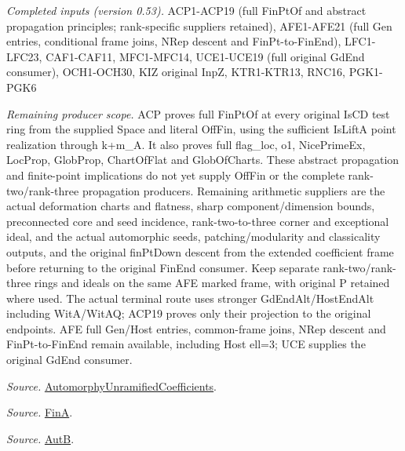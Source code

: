 \emph{Completed inputs (version 0.53).} ACP1-ACP19 (full FinPtOf and abstract propagation principles; rank-specific suppliers retained), AFE1-AFE21 (full Gen entries, conditional frame joins, NRep descent and FinPt-to-FinEnd), LFC1-LFC23, CAF1-CAF11, MFC1-MFC14, UCE1-UCE19 (full original GdEnd consumer), OCH1-OCH30, KIZ original InpZ, KTR1-KTR13, RNC16, PGK1-PGK6

\emph{Remaining producer scope.} ACP proves full FinPtOf at every original IsCD test ring from the supplied Space and literal OffFin, using the sufficient IsLiftA point realization through k+m\_\allowbreak A. It also proves full flag\_\allowbreak loc, o1, NicePrimeEx, LocProp, GlobProp, ChartOfFlat and GlobOfCharts. These abstract propagation and finite-point implications do not yet supply OffFin or the complete rank-two/rank-three propagation producers. Remaining arithmetic suppliers are the actual deformation charts and flatness, sharp component/dimension bounds, preconnected core and seed incidence, rank-two-to-three corner and exceptional ideal, and the actual automorphic seeds, patching/modularity and classicality outputs, and the original finPtDown descent from the extended coefficient frame before returning to the original FinEnd consumer. Keep separate rank-two/rank-three rings and ideals on the same AFE marked frame, with original P retained where used. The actual terminal route uses stronger GdEndAlt/HostEndAlt including WitA/WitAQ; ACP19 proves only their projection to the original endpoints. AFE full Gen/Host entries, common-frame joins, NRep descent and FinPt-to-FinEnd remain available, including Host ell=3; UCE supplies the original GdEnd consumer.

\emph{Source.} \href{https://github.com/CocoSgt/riemann-hypothesis-lean/blob/7cbf7a0c32fca1badf05931879a37c3f8a2b03b4/src/Development/AutomorphicArithmetic/AutomorphicVarieties/AutomorphicCases/AutomorphyUnramifiedCoefficients.lean#L24-L27}{AutomorphyUnramifiedCoefficients}.

\emph{Source.} \href{https://github.com/CocoSgt/riemann-hypothesis-lean/blob/7cbf7a0c32fca1badf05931879a37c3f8a2b03b4/src/Development/AutomorphicArithmetic/AutomorphicVarieties/AutomorphicCases/AutomorphyUnramifiedCoefficients.lean#L12-L13}{FinA}.

\emph{Source.} \href{https://github.com/CocoSgt/riemann-hypothesis-lean/blob/7cbf7a0c32fca1badf05931879a37c3f8a2b03b4/src/Development/AutomorphicArithmetic/AutomorphicVarieties/AutomorphicCases/AutomorphyUnramifiedCoefficients.lean#L15-L17}{AutB}.


